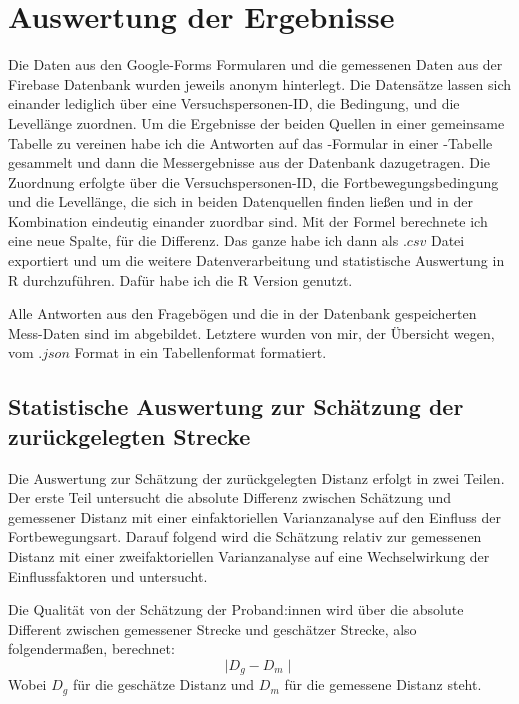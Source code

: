 
        \section{Auswertung der Ergebnisse}
            Die Daten aus den Google-Forms Formularen und die gemessenen Daten aus der Firebase Datenbank wurden jeweils anonym hinterlegt. Die Datensätze lassen sich einander lediglich über eine Versuchspersonen-ID, die Bedingung, und die Levellänge
            zuordnen.
            Um die Ergebnisse der beiden Quellen in einer gemeinsame Tabelle zu vereinen habe ich die Antworten auf das -Formular in einer -Tabelle gesammelt und dann die Messergebnisse aus der Datenbank dazugetragen. Die Zuordnung erfolgte über die Versuchspersonen-ID, die Fortbewegungsbedingung und die Levellänge, die sich in beiden Datenquellen finden ließen und in der Kombination eindeutig einander zuordbar sind.
            Mit der Formel %
            berechnete ich eine neue Spalte, für die Differenz. Das ganze habe ich dann als $.csv$ Datei exportiert und um die weitere Datenverarbeitung und statistische Auswertung in R durchzuführen. Dafür habe ich die R Version  genutzt.

            Alle Antworten aus den Fragebögen und die in der Datenbank gespeicherten Mess-Daten sind im  abgebildet. Letztere wurden von mir, der Übersicht wegen, vom $.json$ Format in ein Tabellenformat formatiert.

                \subsection{Statistische Auswertung zur Schätzung der zurückgelegten Strecke}
                    Die Auswertung zur Schätzung der zurückgelegten Distanz erfolgt in zwei Teilen.
                    Der erste Teil untersucht die absolute Differenz zwischen Schätzung und gemessener Distanz mit einer einfaktoriellen Varianzanalyse auf den Einfluss der Fortbewegungsart.
                    Darauf folgend wird die Schätzung relativ zur gemessenen Distanz mit einer zweifaktoriellen Varianzanalyse auf eine Wechselwirkung der Einflussfaktoren  und  untersucht.

                    Die Qualität von der Schätzung der Proband:innen wird über die absolute Different zwischen gemessener Strecke und geschätzer Strecke, also folgendermaßen, berechnet:
                    $$ \mid D_g - D_m \mid $$
                    Wobei $D_g$ für die geschätze Distanz und $D_m$ für die gemessene Distanz steht.

